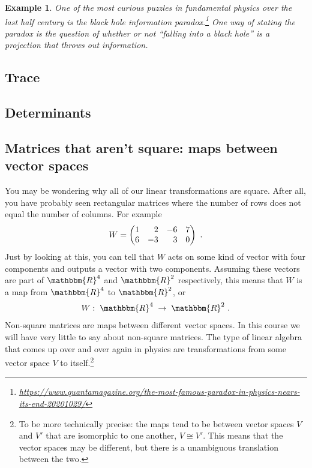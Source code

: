 \documentclass[12pt]{article}
\newtheorem{example}{Example}[section]
\begin{document}
\begin{example}
One of the most curious puzzles in fundamental physics over the last half century is the black hole information paradox.\footnote{\url{https://www.quantamagazine.org/the-most-famous-paradox-in-physics-nears-its-end-20201029/}} One way of stating the paradox is the question of whether or not ``falling into a black hole'' is a \emph{projection} that throws out information. 
\end{example}

\subsection{Trace}

\subsection{Determinants}

\subsection{Matrices that aren't square: maps between vector spaces}

You may be wondering why all of our linear transformations are square. After all, you have probably seen rectangular matrices where the number of rows does not equal the number of columns. For example
\begin{align}
    W = 
    \begin{pmatrix}
        1 & \pp 2 &-6 & 7 \\
        6 & -3 & \pp 3 & 0
    \end{pmatrix} \ .
\end{align}
Just by looking at this, you can tell that $W$ acts on some kind of vector with four components and outputs a vector with two components. Assuming these vectors are part of $\mathbbm{R}^4$ and $\mathbbm{R}^2$ respectively, this means that $W$ is a map from $\mathbbm{R}^4$ to $\mathbbm{R}^2$, or
\begin{align}
    W:\; \mathbbm{R}^4 \;\to \; \mathbbm{R}^2 \ .
\end{align}
Non-square matrices are maps between different vector spaces. In this course we will have very little to say about non-square matrices. The type of linear algebra that comes up over and over again in physics are transformations from some vector space $V$ to itself.\footnote{To be more technically precise: the maps tend to be between vector spaces $V$ and $V'$ that are isomorphic to one another, $V\cong V'$. This means that the vector spaces may be different, but there is a unambiguous translation between the two.} 
\end{document}
